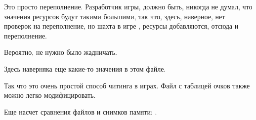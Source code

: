 Это просто переполнение. 
Разработчик игры, должно быть, никогда не думал, что значения ресурсов будут такими большими,
так что, здесь, наверное, нет проверок на переполнение, но шахта в игре , ресурсы добавляются,
отсюда и переполнение.

Вероятно, не нужно было жадничать.

Здесь наверняка еще какие-то значения в этом файле.

Так что это очень простой способ читинга в играх.
Файл с таблицей очков также можно легко модифицировать.

Еще насчет сравнения файлов и снимков памяти: .

